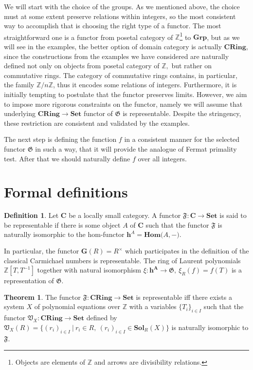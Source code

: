 \documentclass{article}
\theoremstyle{definition}
\theoremstyle{definition}
\newtheorem{definition}{Definition}
\newtheorem{theorem}{Theorem}
\begin{document}
We will start with the choice of the groups. As we mentioned above, the choice must at some extent preserve relations within integers, so the most consistent way to accomplish that is choosing the right type of a functor. The most straightforward one is a functor from posetal category of $\mathbb{Z}$\footnote{Objects are elements of $\mathbb{Z}$ and arrows are divisibility relations.} to $\mathbf{Grp}$, but as we will see in the examples, the better option of domain category is actually $\mathbf{CRing}$, since the constructions from the examples we have considered are naturally defined not only on objects from posetal category of $\mathbb{Z},$ but rather on commutative rings. The category of commutative rings contains, in particular, the family $\mathbb{Z}/n\mathbb{Z}$, thus it encodes some relations of integers. Furthermore, it is initially tempting to postulate that the functor preserves limits. However, we aim to impose more rigorous constraints on the functor, namely we will assume that underlying $\mathbf{CRing} \xrightarrow{} \mathbf{Set}$ functor of $\mathfrak{G}$ is representable. Despite the stringency, these restriction are consistent and validated by the examples. 

The next step is defining the function $f$ in a consistent manner for the selected functor $\mathfrak{G}$ in such a way, that it will provide the analogue of Fermat primality test.
After that we should naturally define $f$ over all integers.

\section{Formal definitions}

\begin{definition}
    Let $\mathbf{C}$ be a locally small category. A functor $\mathfrak{F}:\mathbf{C}\xrightarrow{}\mathbf{Set}$ is said to be representable if there is some object $A$ of $\mathbf{C}$ such that the functor $\mathfrak{F}$ is naturally isomorphic to the hom-functor $\mathbf{h}^A = \mathbf{Hom(}A\mathbf{, -)}$.
\end{definition}

In particular, the functor $\mathbf{G}(R)=R^\times$ which participates in the definition of the classical Carmichael numbers is representable. The ring of Laurent polynomials $\mathbb{Z}[T, T^{-1}]$ together with natural isomorphism $\xi:\mathbf{h^A} \xrightarrow{} \mathfrak{G},\ \xi_R(f)=f(T)$ is a representation of $\mathfrak{G}$.

\begin{theorem}
The functor $\mathfrak{F}:\mathbf{CRing}\xrightarrow{}\mathbf{Set}$ is representable iff there exists a system $X$ of polynomial equations over $\mathbb{Z}$ with a variables $\{T_i\}_{i\in I}$ such that the functor $\mathfrak{V}_X : \mathbf{CRing} \xrightarrow{} \mathbf{Set}$ defined by $\mathfrak{V}_X(R) = \{(r_i)_{i\in I} \ | \ r_i \in R, \ (r_i)_{i\in I} \in \mathbf{Sol}_R(X)\}$ is naturally isomorphic to $\mathfrak{F}$.
\end{theorem}
\end{document}
